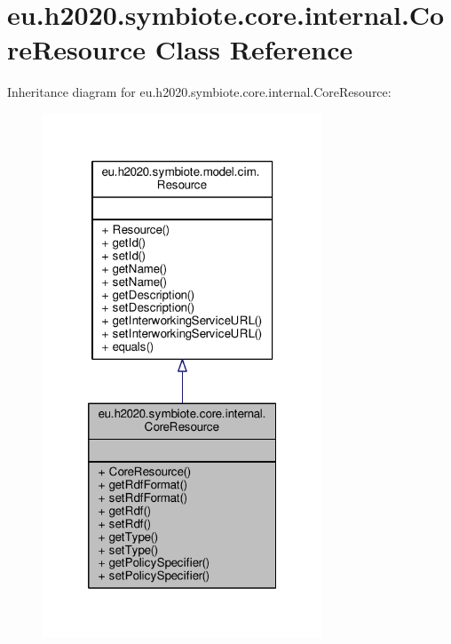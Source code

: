 \hypertarget{classeu_1_1h2020_1_1symbiote_1_1core_1_1internal_1_1CoreResource}{}\section{eu.\+h2020.\+symbiote.\+core.\+internal.\+Core\+Resource Class Reference}
\label{classeu_1_1h2020_1_1symbiote_1_1core_1_1internal_1_1CoreResource}


Inheritance diagram for eu.\+h2020.\+symbiote.\+core.\+internal.\+Core\+Resource\+:\nopagebreak
\begin{figure}[H]
\begin{center}
\leavevmode
\includegraphics[width=236pt]{classeu_1_1h2020_1_1symbiote_1_1core_1_1internal_1_1CoreResource__inherit__graph}
\end{center}
\end{figure}


